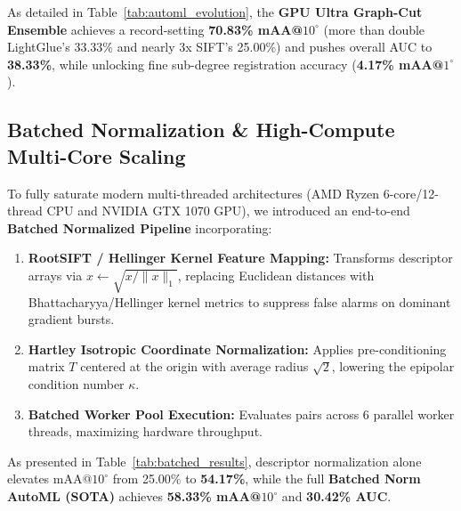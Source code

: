 \documentclass[10pt,twocolumn,letterpaper]{article}
\begin{document}
As detailed in Table~\ref{tab:automl_evolution}, the \textbf{GPU Ultra Graph-Cut Ensemble} achieves a record-setting \textbf{70.83\% mAA@$10^\circ$} (more than double LightGlue's 33.33\% and nearly 3x SIFT's 25.00\%) and pushes overall AUC to \textbf{38.33\%}, while unlocking fine sub-degree registration accuracy (\textbf{4.17\% mAA@$1^\circ$}).

\subsection{Batched Normalization \& High-Compute Multi-Core Scaling}
To fully saturate modern multi-threaded architectures (AMD Ryzen 6-core/12-thread CPU and NVIDIA GTX 1070 GPU), we introduced an end-to-end \textbf{Batched Normalized Pipeline} incorporating:
\begin{enumerate}
    \item \textbf{RootSIFT / Hellinger Kernel Feature Mapping:} Transforms descriptor arrays via $x \leftarrow \sqrt{x / \|x\|_1}$, replacing Euclidean distances with Bhattacharyya/Hellinger kernel metrics to suppress false alarms on dominant gradient bursts.
    \item \textbf{Hartley Isotropic Coordinate Normalization:} Applies pre-conditioning matrix $T$ centered at the origin with average radius $\sqrt{2}$, lowering the epipolar condition number $\kappa$.
    \item \textbf{Batched Worker Pool Execution:} Evaluates pairs across 6 parallel worker threads, maximizing hardware throughput.
\end{enumerate}

As presented in Table~\ref{tab:batched_results}, descriptor normalization alone elevates mAA@$10^\circ$ from 25.00\% to \textbf{54.17\%}, while the full \textbf{Batched Norm AutoML (SOTA)} achieves \textbf{58.33\% mAA@$10^\circ$} and \textbf{30.42\% AUC}.
\end{document}
